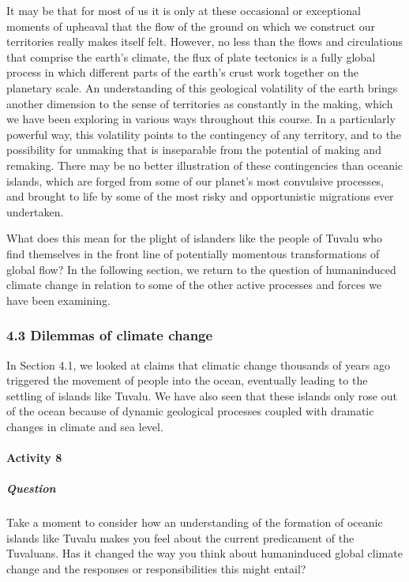 \documentclass[letterpaper,10pt,english]{sphinxmanual}
\begin{document}
It may be that for most of us it is only at these occasional or exceptional moments of upheaval that the flow of the ground on which we construct our territories really makes itself felt. However, no less than the flows and circulations that comprise the earth’s climate, the flux of plate tectonics is a fully global process in which different parts of the earth’s crust work together on the planetary scale. An understanding of this geological volatility of the earth brings another dimension to
the sense of territories as constantly in the making, which we have been exploring in various ways throughout this course. In a particularly powerful way, this volatility points to the contingency of any territory, and to the possibility for unmaking that is inseparable from the potential of making and remaking. There may be no better illustration of these contingencies than oceanic islands, which are forged from some of our planet’s most convulsive processes, and brought to life by some of the
most risky and opportunistic migrations ever undertaken.

What does this mean for the plight of islanders like the people of Tuvalu who find themselves in the front line of potentially momentous transformations of global flow? In the following section, we return to the question of human\sphinxhyphen{}induced climate change in relation to some of the other active processes and forces we have been examining.


\subsubsection{4.3 Dilemmas of climate change}
\label{\detokenize{content/session_00/Part_00_04:4.3-Dilemmas-of-climate-change}}
In Section 4.1, we looked at claims that climatic change thousands of years ago triggered the movement of people into the ocean, eventually leading to the settling of islands like Tuvalu. We have also seen that these islands only rose out of the ocean because of dynamic geological processes coupled with dramatic changes in climate and sea level.


\paragraph{Activity 8}
\label{\detokenize{content/session_00/Part_00_04:Activity-8}}

\subparagraph{Question}
\label{\detokenize{content/session_00/Part_00_04:id1}}
Take a moment to consider how an understanding of the formation of oceanic islands like Tuvalu makes you feel about the current predicament of the Tuvaluans. Has it changed the way you think about human\sphinxhyphen{}induced global climate change and the responses or responsibilities this might entail?
\end{document}
